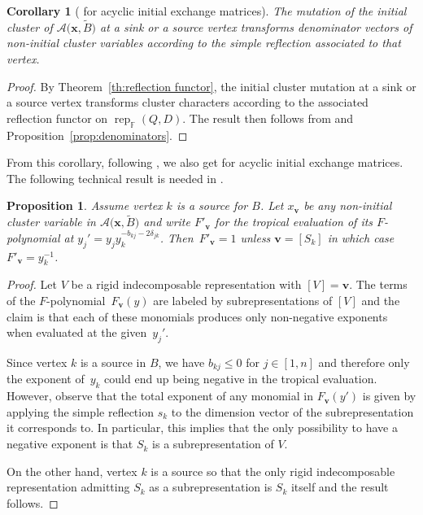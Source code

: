 \documentclass[pdftex]{sigma}
\newcommand{\bfv}{\mathbf{v}}
\newcommand{\bfx}{\mathbf{x}}
\newcommand{\cA}{\mathcal{A}}
\newcommand{\FF}{\mathbb{F}}
\newcommand{\rep}{\operatorname{rep}}
\numberwithin{equation}{section}
\newtheorem{Corollary}[Theorem]{Corollary}
\newtheorem{Proposition}[Theorem]{Proposition}
 { \theoremstyle{definition}
\newtheorem{Remark}[Theorem]{Remark} }
\begin{document}
\begin{Corollary}[{\cite[Conjecture 2.8]{reading-stella}} for acyclic initial exchange matrices] The mutation of the initial cluster of $\cA\big(\bfx,\widetilde{B}\big)$ at a sink or a source vertex transforms denominator vectors of non-initial cluster variables according to the simple reflection associated to that vertex.
\end{Corollary}
\begin{proof} By Theorem~\ref{th:reflection functor}, the initial cluster mutation at a sink or a source vertex transforms cluster characters according to the associated reflection functor on $\rep_{\FF}(Q,D)$. The result then follows from \cite[Proposition~2.1]{dlab-ringel} and Proposition~\ref{prop:denominators}.
\end{proof}

From this corollary, following \cite[Proposition 2.10]{reading-stella}, we also get \cite[Conjecture 2.7]{reading-stella} for acyclic initial exchange matrices. The following technical result is needed in \cite{rupel-stella-williams}.

 \begin{Proposition} \label{prop:principal F-polynomials} Assume vertex $k$ is a source for $B$. Let $x_\bfv$ be any non-initial cluster variable in $\cA\big(\bfx,\widetilde{B}\big)$ and write $F'_\bfv$ for the tropical evaluation of its $F$-polynomial at $y_j'=y_jy_k^{-b_{kj}-2\delta_{jk}}$. Then~$F'_\bfv=1$ unless $\bfv=[S_k]$ in which case $F'_\bfv=y_k^{-1}$.
 \end{Proposition}
 \begin{proof} Let $V$ be a rigid indecomposable representation with $[V]=\bfv$. The terms of the $F$-polynomial~$F_\bfv(y)$ are labeled by subrepresentations of $[V]$ and the claim is that each of these monomials produces only non-negative exponents when evaluated at the given~$y_j'$.

Since vertex $k$ is a source in $B$, we have $b_{kj}\leq 0$ for $j\in[1,n]$ and therefore only the exponent of~$y_k$ could end up being negative in the tropical evaluation. However, observe that the total exponent of any monomial in $F_\bfv(y')$ is given by applying the simple reflection $s_k$ to the dimension vector of the subrepresentation it corresponds to. In particular, this implies that the only possibility to have a negative exponent is that $S_k$ is a subrepresentation of $V$.

On the other hand, vertex $k$ is a source so that the only rigid indecomposable representation admitting $S_k$ as a subrepresentation is $S_k$ itself and the result follows.
\end{proof}
\end{document}
